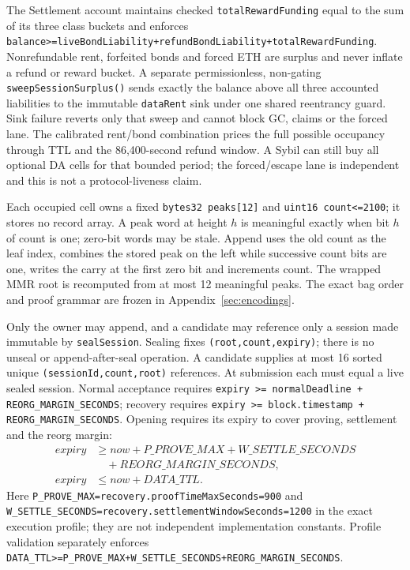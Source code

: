 \documentclass[a4paper,11pt]{article}
\newcommand{\code}[1]{\nolinkurl{#1}}
\begin{document}
The Settlement account maintains checked \code{totalRewardFunding} equal to
the sum of its three class buckets and enforces
\code{balance>=liveBondLiability+refundBondLiability+totalRewardFunding}.
Nonrefundable rent, forfeited bonds and forced ETH are surplus and never inflate
a refund or reward bucket.  A
separate permissionless, non-gating \code{sweepSessionSurplus()} sends exactly
the balance above all three accounted liabilities to the immutable
\code{dataRent} sink under one shared reentrancy guard.  Sink failure reverts
only that sweep and cannot block GC, claims or the forced lane.
The calibrated rent/bond combination
prices the full possible occupancy through TTL and the 86,400-second refund
window.  A Sybil can still buy all optional DA cells for that bounded period;
the forced/escape lane is independent and this is not a protocol-liveness claim.

Each occupied cell owns a fixed \code{bytes32 peaks[12]} and
\code{uint16 count<=2100}; it stores no record array.  A peak word at height
$h$ is meaningful exactly when bit $h$ of count is one; zero-bit words may be
stale.  Append uses the old count as the leaf index, combines the stored peak on
the left while successive count bits are one, writes the carry at the first
zero bit and increments count.  The wrapped MMR root is recomputed from at most
12 meaningful peaks.  The exact bag order and proof grammar are frozen in
Appendix~\ref{sec:encodings}.

Only the owner may append, and a candidate may reference only a session made
immutable by \code{sealSession}.  Sealing fixes \code{(root,count,expiry)};
there is no unseal or append-after-seal operation.  A candidate supplies at most
16 sorted unique \code{(sessionId,count,root)} references.  At submission each
must equal a live sealed session.  Normal acceptance requires
\code{expiry >= normalDeadline + REORG_MARGIN_SECONDS}; recovery requires
\code{expiry >= block.timestamp + REORG_MARGIN_SECONDS}.  Opening requires
its expiry to cover proving, settlement and the reorg margin:
\begin{align*}
expiry &\ge now+P\_PROVE\_MAX+W\_SETTLE\_SECONDS\\
       &\quad+REORG\_MARGIN\_SECONDS,\\
expiry &\le now+DATA\_TTL.
\end{align*}
Here \code{P\_PROVE\_MAX=recovery.proofTimeMaxSeconds=900} and
\code{W\_SETTLE\_SECONDS=recovery.settlementWindowSeconds=1200} in the exact
execution profile; they are not independent implementation constants.  Profile
validation separately enforces
\code{DATA\_TTL>=P\_PROVE\_MAX+W\_SETTLE\_SECONDS+REORG\_MARGIN\_SECONDS}.
\end{document}
